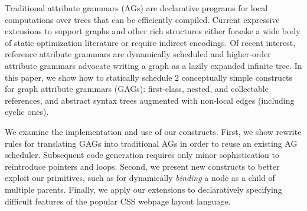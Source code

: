 Traditional attribute grammars (AGs) are declarative programs for local computations over trees that can be efficiently compiled. Current expressive extensions to support graphs and other rich structures either forsake a wide body of static optimization literature or require indirect encodings. Of recent interest, reference attribute grammars are dynamically scheduled and higher-order attribute grammars advocate writing a graph as a lazily expanded infinite tree. In this paper, we show how to statically schedule 2 conceptually simple constructs for graph attribute grammars (GAGs): first-class, nested, and collectable references, and abstract syntax trees augmented with non-local edges (including cyclic ones).

We examine the implementation and use of our constructs. First, we show rewrite rules for translating GAGs into traditional AGs in order to reuse an existing AG scheduler. Subsequent code generation requires only minor sophistication to reintroduce pointers and loops. Second, we present new constructs to better exploit our primitives, such as for dynamically \emph{binding} a node as a child of multiple parents. Finally, we apply our extensions to declaratively specifying difficult features of the popular CSS webpage layout language.



